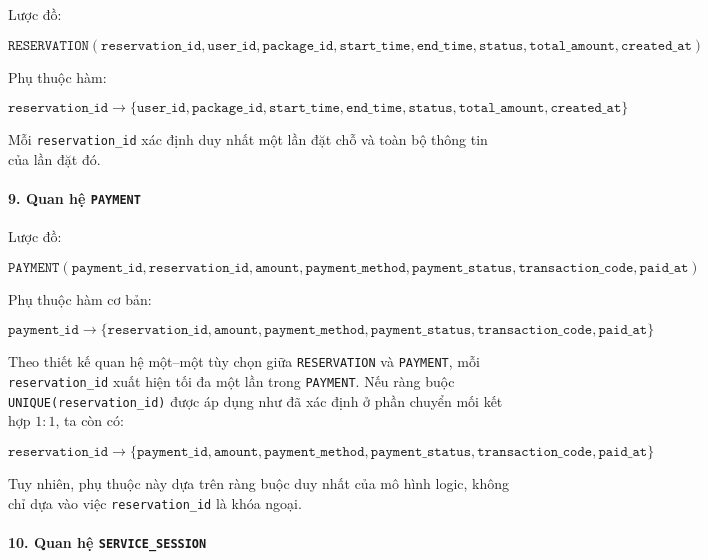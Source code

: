 Lược đồ:

$$
\texttt{RESERVATION}(
\texttt{reservation\_id}, \texttt{user\_id}, \texttt{package\_id},
\texttt{start\_time}, \texttt{end\_time}, \texttt{status},
\texttt{total\_amount}, \texttt{created\_at}
)
$$

Phụ thuộc hàm:

$$
\texttt{reservation\_id}
\rightarrow
\{
\texttt{user\_id}, \texttt{package\_id}, \texttt{start\_time},
\texttt{end\_time}, \texttt{status}, \texttt{total\_amount},
\texttt{created\_at}
\}
$$

Mỗi \texttt{reservation\_id} xác định duy nhất một lần đặt chỗ và toàn bộ thông tin của lần đặt đó.

\paragraph{9. Quan hệ \texttt{PAYMENT}}\mbox{}\par

Lược đồ:

$$
\texttt{PAYMENT}(
\texttt{payment\_id}, \texttt{reservation\_id}, \texttt{amount},
\texttt{payment\_method}, \texttt{payment\_status},
\texttt{transaction\_code}, \texttt{paid\_at}
)
$$

Phụ thuộc hàm cơ bản:

$$
\texttt{payment\_id}
\rightarrow
\{
\texttt{reservation\_id}, \texttt{amount}, \texttt{payment\_method},
\texttt{payment\_status}, \texttt{transaction\_code}, \texttt{paid\_at}
\}
$$

Theo thiết kế quan hệ một--một tùy chọn giữa \texttt{RESERVATION} và \texttt{PAYMENT}, mỗi \texttt{reservation\_id} xuất hiện tối đa một lần trong \texttt{PAYMENT}. Nếu ràng buộc \texttt{UNIQUE(reservation\_id)} được áp dụng như đã xác định ở phần chuyển mối kết hợp $1:1$, ta còn có:

$$
\texttt{reservation\_id}
\rightarrow
\{
\texttt{payment\_id}, \texttt{amount}, \texttt{payment\_method},
\texttt{payment\_status}, \texttt{transaction\_code}, \texttt{paid\_at}
\}
$$

Tuy nhiên, phụ thuộc này dựa trên ràng buộc duy nhất của mô hình logic, không chỉ dựa vào việc \texttt{reservation\_id} là khóa ngoại.

\paragraph{10. Quan hệ \texttt{SERVICE\_SESSION}}\mbox{}\par

